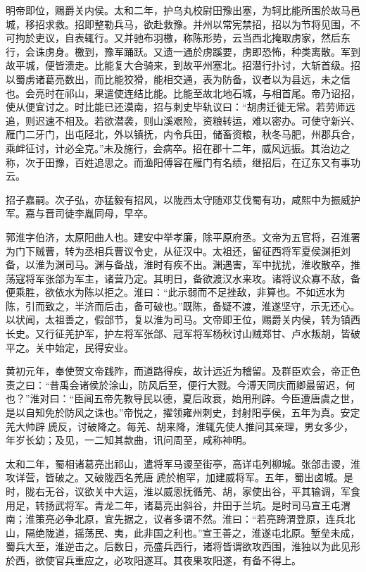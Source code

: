 \documentclass[12pt,UTF8]{ctexbook}
\begin{document}
明帝即位，赐爵关内侯。太和二年，护乌丸校尉田豫出塞，为轲比能所围於故马邑城，移招求救。招即整勒兵马，欲赴救豫。并州以常宪禁招，招以为节将见围，不可拘於吏议，自表辄行。又并驰布羽檄，称陈形势，云当西北掩取虏家，然后东行，会诛虏身。檄到，豫军踊跃。又遗一通於虏蹊要，虏即恐怖，种类离散。军到故平城，便皆溃走。比能复大合骑来，到故平州塞北。招潜行扑讨，大斩首级。招以蜀虏诸葛亮数出，而比能狡猾，能相交通，表为防备，议者以为县远，未之信也。会亮时在祁山，果遣使连结比能。比能至故北地石城，与相首尾。帝乃诏招，使从便宜讨之。时比能已还漠南，招与刺史毕轨议曰：“胡虏迁徙无常。若劳师远追，则迟速不相及。若欲潜袭，则山溪艰险，资粮转运，难以密办。可使守新兴、雁门二牙门，出屯陉北，外以镇抚，内令兵田，储畜资粮，秋冬马肥，州郡兵合，乘衅征讨，计必全克。”未及施行，会病卒。招在郡十二年，威风远振。其治边之称，次于田豫，百姓追思之。而渔阳傅容在雁门有名绩，继招后，在辽东又有事功云。

招子嘉嗣。次子弘，亦猛毅有招风，以陇西太守随邓艾伐蜀有功，咸熙中为振威护军。嘉与晋司徒李胤同母，早卒。

郭淮字伯济，太原阳曲人也。建安中举孝廉，除平原府丞。文帝为五官将，召淮署为门下贼曹，转为丞相兵曹议令史，从征汉中。太祖还，留征西将军夏侯渊拒刘备，以淮为渊司马。渊与备战，淮时有疾不出。渊遇害，军中扰扰，淮收散卒，推荡寇将军张郃为军主，诸营乃定。其明日，备欲渡汉水来攻。诸将议众寡不敌，备便乘胜，欲依水为陈以拒之。淮曰：“此示弱而不足挫敌，非算也。不如远水为陈，引而致之，半济而后击，备可破也。”既陈，备疑不渡，淮遂坚守，示无还心。以状闻，太祖善之，假郃节，复以淮为司马。文帝即王位，赐爵关内侯，转为镇西长史。又行征羌护军，护左将军张郃、冠军将军杨秋讨山贼郑甘、卢水叛胡，皆破平之。关中始定，民得安业。

黄初元年，奉使贺文帝践阼，而道路得疾，故计远近为稽留。及群臣欢会，帝正色责之曰：“昔禹会诸侯於涂山，防风后至，便行大戮。今溥天同庆而卿最留迟，何也？”淮对曰：“臣闻五帝先教导民以德，夏后政衰，始用刑辟。今臣遭唐虞之世，是以自知免於防风之诛也。”帝悦之，擢领雍州刺史，封射阳亭侯，五年为真。安定羌大帅辟虒反，讨破降之。每羌、胡来降，淮辄先使人推问其亲理，男女多少，年岁长幼；及见，一二知其款曲，讯问周至，咸称神明。

太和二年，蜀相诸葛亮出祁山，遣将军马谡至街亭，高详屯列柳城。张郃击谡，淮攻详营，皆破之。又破陇西名羌唐虒於枹罕，加建威将军。五年，蜀出卤城。是时，陇右无谷，议欲关中大运，淮以威恩抚循羌、胡，家使出谷，平其输调，军食用足，转扬武将军。青龙二年，诸葛亮出斜谷，并田于兰坑。是时司马宣王屯渭南；淮策亮必争北原，宜先据之，议者多谓不然。淮曰：“若亮跨渭登原，连兵北山，隔绝陇道，摇荡民、夷，此非国之利也。”宣王善之，淮遂屯北原。堑垒未成，蜀兵大至，淮逆击之。后数日，亮盛兵西行，诸将皆谓欲攻西围，淮独以为此见形於西，欲使官兵重应之，必攻阳遂耳。其夜果攻阳遂，有备不得上。
\end{document}
